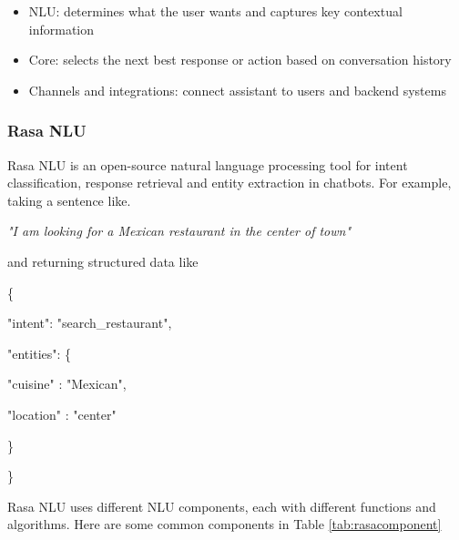 \begin{itemize}
\item NLU: determines what the user wants and captures key contextual information
\item Core: selects the next best response or action based on conversation history
\item Channels and integrations: connect assistant to users and backend systems
\end{itemize}

\subsubsection{Rasa NLU}

Rasa NLU is an open-source natural language processing tool for intent classification, response retrieval and entity extraction in chatbots. For example, taking a sentence like.

\textit{"I am looking for a Mexican restaurant in the center of town"}

and returning structured data like

\{

  \quad"intent": "search\_restaurant",
  
  \quad"entities": \{
  
    \qquad"cuisine" : "Mexican",
    
    \qquad"location" : "center"
    
  \quad\}
  
\}

Rasa NLU uses different NLU components, each with different functions and algorithms. Here are some common components in Table \ref{tab:rasacomponent}

